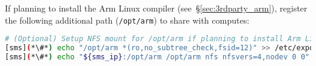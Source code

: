 \noindent If planning to install the Arm Linux compiler
(see~\S\ref{sec:3rdparty_arm}), register the
following additional path (\texttt{/opt/arm}) to share with computes:
\begin{lstlisting}[language=bash,keywords={},upquote=true,keepspaces]
# (Optional) Setup NFS mount for /opt/arm if planning to install Arm Linux compiler packages
[sms](*\#*) echo "/opt/arm *(ro,no_subtree_check,fsid=12)" >> /etc/exports
[sms](*\#*) echo "${sms_ip}:/opt/arm /opt/arm nfs nfsvers=4,nodev 0 0" >> $CHROOT/etc/fstab
\end{lstlisting}
